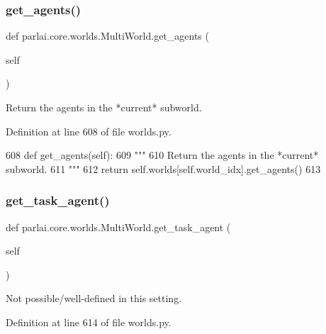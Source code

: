 \subsubsection{\texorpdfstring{get\+\_\+agents()}{get\_agents()}}
{\footnotesize\ttfamily def parlai.\+core.\+worlds.\+Multi\+World.\+get\+\_\+agents (\begin{DoxyParamCaption}\item[{}]{self }\end{DoxyParamCaption})}

\begin{DoxyVerb}Return the agents in the *current* subworld.
\end{DoxyVerb}
 

Definition at line 608 of file worlds.\+py.


\begin{DoxyCode}
608     \textcolor{keyword}{def }get\_agents(self):
609         \textcolor{stringliteral}{"""}
610 \textcolor{stringliteral}{        Return the agents in the *current* subworld.}
611 \textcolor{stringliteral}{        """}
612         \textcolor{keywordflow}{return} self.worlds[self.world\_idx].get\_agents()
613 
\end{DoxyCode}
\mbox{\label{classparlai_1_1core_1_1worlds_1_1MultiWorld_a593c1eb833633014c2506abd80695317}} 
\subsubsection{\texorpdfstring{get\+\_\+task\+\_\+agent()}{get\_task\_agent()}}
{\footnotesize\ttfamily def parlai.\+core.\+worlds.\+Multi\+World.\+get\+\_\+task\+\_\+agent (\begin{DoxyParamCaption}\item[{}]{self }\end{DoxyParamCaption})}

\begin{DoxyVerb}Not possible/well-defined in this setting.
\end{DoxyVerb}
 

Definition at line 614 of file worlds.\+py.


